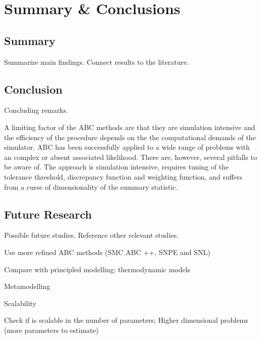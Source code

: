 \chapter{Summary \& Conclusions}\label{chap:Conclusion}

\section{Summary}\label{sec:summary}

Summarize main findings. Connect results to the literature. 

\section{Conclusion}\label{sec:conclusion}

Concluding remarks.

A limiting factor of the ABC methods are that they are simulation intensive and the efficiency of the procedure depends on the the computational demands of the simulator.  
ABC has been successfully applied to a wide range of problems with an complex or absent associated likelihood. There are, however, several pitfalls to be aware of. The approach is simulation intensive, requires tuning of the tolerance threshold, discrepancy function and weighting function, and suffers from a curse of dimensionality of the summary statistic.  

\section{Future Research}\label{sec:future}

Possible future studies. Reference other relevant studies. 

Use more refined ABC methods
(SMC ABC ++, SNPE and SNL)

Compare with principled modelling; thermodynamic models

Metamodelling

Scalability 

Check if is scalable in the number of parameters;
Higher dimensional problems (more parameters to estimate)

